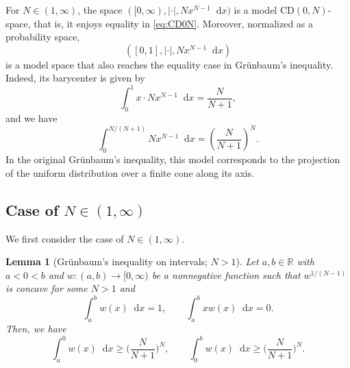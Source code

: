 \documentclass[sts]{imsart}
\newtheorem{lemma}[theorem]{Lemma}
\theoremstyle{definition}
\theoremstyle{remark}
\newcommand{\R}{\mathbb{R}}
\newcommand{\lra}{\longrightarrow}
\newcommand{\CD}{\mathrm{CD}}
\newcommand*\diff{\mathop{}\!\mathrm{d}}
\begin{document}
For $N \in (1,\infty)$, the space $([0,\infty),|\cdot|,Nx^{N-1} \diff x)$ is a model $\CD(0,N)$-space, that is, it enjoys equality in \eqref{eq:CD0N}.
Moreover, normalized as a probability space, 
\begin{equation}\label{eq:model}
([0,1],|\cdot|,Nx^{N-1} \diff x)
\end{equation}
is a model space that also reaches the equality case in Gr\"unbaum's inequality.
Indeed, its barycenter is given by
\[
\int_0^1 x \cdot Nx^{N-1} \diff x = \frac{N}{N+1},
\]
and we have
\[
\int_0^{N/(N+1)} Nx^{N-1} \diff x = \left(\frac{N}{N+1} \right)^N.
\]
In the original Gr\"unbaum's inequality, this model corresponds to the projection of the uniform distribution over a finite cone along its axis.


\subsection{Case of $N \in (1,\infty)$}\label{ssc:1d_pos}%

We first consider the case of $N \in (1,\infty)$.

\begin{lemma}[Gr\"unbaum's inequality on intervals; $N>1$]\label{lm:Grunbaum1d}
Let $a,b\in\R$ with $a<0<b$ and $w\colon (a,b) \lra [0,\infty)$ be a nonnegative function such that $w^{1/(N-1)}$ is concave for some $N>1$ and
\[
\int_a^b w(x) \diff x=1, \qquad \int_a^b xw(x)\diff x = 0.
\]
Then, we have
\begin{equation}\label{eq:1d_pos}
\int_a^0 w(x) \diff x \geq \biggl( \frac{N}{N+1} \biggr)^N, \qquad
\int_0^b w(x) \diff x \geq \biggl( \frac{N}{N+1} \biggr)^N.
\end{equation}
\end{lemma}
\end{document}
